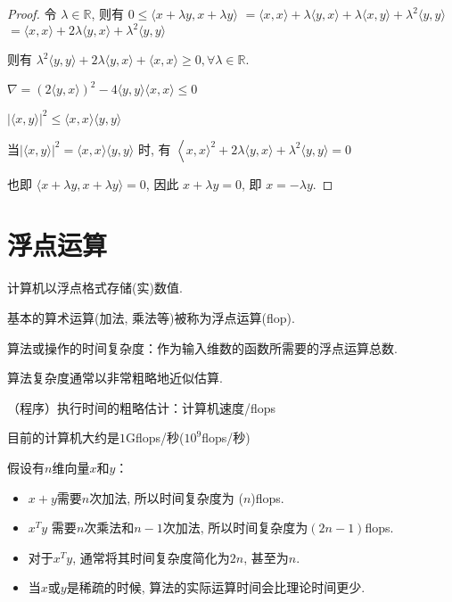 \begin{proof}
    令 \( \lambda \in \mathbb{R} \), 则有 \( 0 \leq\langle x+\lambda y, x+\lambda y\rangle \) \( =\langle x, x\rangle+\lambda\langle y, x\rangle+\lambda\langle x, y\rangle+\lambda^{2}\langle y, y\rangle \) \( =\langle x, x\rangle+2 \lambda\langle y, x\rangle+\lambda^{2}\langle y, y\rangle \) 
    
    则有 \( \lambda^{2}\langle y, y\rangle+2 \lambda\langle y, x\rangle+\langle x, x\rangle \geq 0, \forall \lambda \in \mathbb{R} . \)

    \( \nabla=(2\langle y, x\rangle)^{2}-4\langle y, y\rangle\langle x, x\rangle \leq 0 \)
    
\( |\langle x, y\rangle|^{2} \leq\langle x, x\rangle\langle y, y\rangle \)

当$ |\langle x, y\rangle|^{2}=\langle x, x\rangle\langle y, y\rangle $ 时,  有 $ \left\langle x, x\rangle^2 +2 \lambda\langle y, x\rangle+\lambda^{2}\langle y, y\rangle=0\right. $

也即 \( \langle x+\lambda y, x+\lambda y\rangle=0 \), 因此 \( x+\lambda y=0 \), 即 \( x=-\lambda y \).
\end{proof}

\section{浮点运算}

计算机以浮点格式存储(实)数值. 

基本的算术运算(加法, 乘法等)被称为浮点运算(flop). 

算法或操作的时间复杂度：作为输入维数的函数所需要的浮点运算总数. 

算法复杂度通常以非常粗略地近似估算. 

（程序）执行时间的粗略估计：计算机速度/flops

目前的计算机大约是$1$Gflops/秒($10^9$flops/秒)

\begin{corollary}
    假设有$n$维向量$x$和$y$：

    \begin{itemize}
        \item $x+y$需要$n$次加法, 所以时间复杂度为 ($n$)flops. 
        \item $x^T y$ 需要$n$次乘法和$n - 1$次加法, 所以时间复杂度为$(2n - 1)$flops. 
        \item 对于$x^T y$, 通常将其时间复杂度简化为$2n$, 甚至为$n$. 
        \item 当$x$或$y$是稀疏的时候, 算法的实际运算时间会比理论时间更少. 
    \end{itemize}
\end{corollary}



